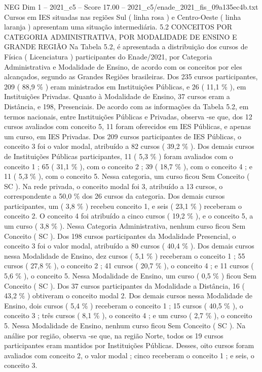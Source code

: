 \begin{textsample}{NEG Dim 1 – 2021\_c5 – Score 17.00 – 2021\_c5/enade\_2021\_fis\_09a135ec4b.txt}
Cursos em IES situadas nas regiões Sul ( linha rosa ) e Centro-Oeste ( linha laranja ) apresentam uma situação intermediária. 5.2 CONCEITOS POR CATEGORIA ADMINISTRATIVA, POR MODALIDADE DE ENSINO E GRANDE REGIÃO Na Tabela 5.2, é apresentada a distribuição dos cursos de Física ( Licenciatura ) participantes do Enade/2021, por Categoria Administrativa e Modalidade de Ensino, de acordo com os conceitos por eles alcançados, segundo as Grandes Regiões brasileiras.
Dos 235 cursos participantes, 209 ( 88,9 \% ) eram ministrados em Instituições Públicas, e 26 ( 11,1 \% ), em Instituições Privadas.
Quanto à Modalidade de Ensino, 37 cursos eram a Distância, e 198, Presenciais.
De acordo com as informações da Tabela 5.2, em termos nacionais, entre Instituições Públicas e Privadas, observa -se que, dos 12 cursos avaliados com conceito 5, 11 foram oferecidos em IES Públicas, e apenas um curso, em IES Privadas.
Dos 209 cursos participantes de IES Públicas, o conceito 3 foi o valor modal, atribuído a 82 cursos ( 39,2 \% ).
Dos demais cursos de Instituições Públicas participantes, 11 ( 5,3 \% ) foram avaliados com o conceito 1 ; 65 ( 31,1 \% ), com o conceito 2 ; 39 ( 18,7 \% ), com o conceito 4 ; e 11 ( 5,3 \% ), com o conceito 5.
Nessa categoria, um curso ficou Sem Conceito ( SC ).
Na rede privada, o conceito modal foi 3, atribuído a 13 cursos, o correspondente a 50,0 \% dos 26 cursos da categoria.
Dos demais cursos participantes, um ( 3,8 \% ) recebeu conceito 1, e seis ( 23,1 \% ) receberam o conceito 2.
O conceito 4 foi atribuído a cinco cursos ( 19,2 \% ), e o conceito 5, a um curso ( 3,8 \% ).
Nessa Categoria Administrativa, nenhum curso ficou Sem Conceito ( SC ).
Dos 198 cursos participantes da Modalidade Presencial, o conceito 3 foi o valor modal, atribuído a 80 cursos ( 40,4 \% ).
Dos demais cursos nessa Modalidade de Ensino, dez cursos ( 5,1 \% ) receberam o conceito 1 ; 55 cursos ( 27,8 \% ), o conceito 2 ; 41 cursos ( 20,7 \% ), o conceito 4 ; e 11 cursos ( 5,6 \% ), o conceito 5.
Nessa Modalidade de Ensino, um curso ( 0,5 \% ) ficou Sem Conceito ( SC ).
Dos 37 cursos participantes da Modalidade a Distância, 16 ( 43,2 \% ) obtiveram o conceito modal 2.
Dos demais cursos nessa Modalidade de Ensino, dois cursos ( 5,4 \% ) receberam o conceito 1 ; 15 cursos ( 40,5 \% ), o conceito 3 ; três cursos ( 8,1 \% ), o conceito 4 ; e um curso ( 2,7 \% ), o conceito 5.
Nessa Modalidade de Ensino, nenhum curso ficou Sem Conceito ( SC ).
Na análise por região, observa -se que, na região Norte, todos os 19 cursos participantes eram mantidos por Instituições Públicas.
Desses, oito cursos foram avaliados com conceito 2, o valor modal ; cinco receberam o conceito 1 ; e seis, o conceito 3.

\end{textsample}
